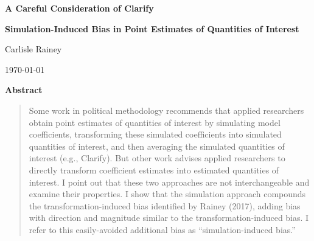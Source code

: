 \documentclass[12pt]{article}
\begin{document}
\begin{center}

{\Large \textbf{A Careful Consideration of Clarify}}

{\textbf{Simulation-Induced Bias in Point Estimates of Quantities of Interest}}



\vspace{1cm}

Carlisle Rainey

\vspace{1cm}
\today
\end{center}
\vspace{5mm}



{\centerline{\textbf{Abstract}}}
\begin{quote}\noindent
Some work in political methodology recommends that applied researchers obtain point estimates of quantities of interest by simulating model coefficients, transforming these simulated coefficients into simulated quantities of interest, and then averaging the simulated quantities of interest (e.g., Clarify). 
But other work advises applied researchers to directly transform coefficient estimates into estimated quantities of interest. 
I point out that these two approaches are not interchangeable and examine their properties. 
I show that the simulation approach compounds the transformation-induced bias identified by Rainey (2017), adding bias with direction and magnitude similar to the transformation-induced bias. I refer to this easily-avoided additional bias as ``simulation-induced bias.'' 
\end{quote}

\end{document}
